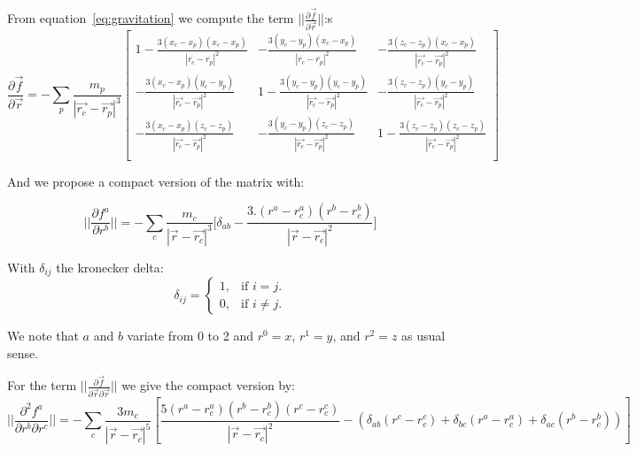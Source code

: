  From equation~\ref{eq:gravitation} we compute the term $||\frac{\partial\vec{f}}{\partial\vec{r}}||$:s
 \begin{equation}
\frac{\partial\vec{f}}{\partial\vec{r}} =
- \sum_p \frac{m_p}{|\vec{r_c}-\vec{r_p}|^3}
\begin{bmatrix}
1 - \frac{3(x_c-x_p)(x_c-x_p)}{|\overline{r_c}-\overline{r_p}|^2} & -\frac{3(y_c-y_p)(x_c-x_p)}{|\overline{r_c}-\overline{r_p}|^2}  & -\frac{3(z_c-z_p)(x_c-x_p)}{|\vec{r_c}-\vec{r_p}|^2}  \\
-\frac{3(x_c-x_p)(y_c-y_p)}{|\vec{r_c}-\vec{r_p}|^2}  & 1 - \frac{3(y_c-y_p)(y_c-y_p)}{|\vec{r_c}-\vec{r_p}|^2} &  -\frac{3(z_c-z_p)(y_c-y_p)}{|\vec{r_c}-\vec{r_p}|^2}\\
- \frac{3(x_c-x_p)(z_c-z_p)}{|\vec{r_c}-\vec{r_p}|^2}   &  -\frac{3(y_c-y_p)(z_c-z_p)}{|\vec{r_c}-\vec{r_p}|^2} &  1- \frac{3(z_c-z_p)(z_c-z_p)}{|\vec{r_c}-\vec{r_p}|^2} \\
\end{bmatrix}
 \end{equation}

And we propose a compact version of the matrix with: 
 
\begin{equation}
 ||\frac{\partial f^a}{\partial r^b}|| = -\sum_c \frac{m_c}{|\vec{r}-\vec{r_c}|^3} \Big[ \delta_{ab} - \frac{3.(r^a-r_c^a)(r^b-r_c^b)}{|\vec{r}-\vec{r_c}|^2} \Big] 
\end{equation}

With $\delta_{ij}$ the kronecker delta:
\begin{equation}
\delta_{ij} = 
\begin{cases}
    1, & \text{if $i = j$}.\\
    0, & \text{if $i\neq j$}.
  \end{cases}
\end{equation}

We note that $a$ and $b$ variate from 0 to 2 and $r^0=x$, $r^1=y$, and $r^2=z$ as usual sense. 

For the term $||\frac{\partial\vec{f}}{\partial\vec{r} \partial\vec{r}}||$ we give the compact version by:
\begin{equation}
||\frac{\partial^2 f^a}{\partial r^b \partial r^c}|| =
- \sum_c \frac{3 m_c}{|\vec{r}-\vec{r_c}|^5} \left[\frac{5(r^a-r_c^a)(r^b-r_c^b)(r^c-r_c^c)}{|\vec{r}-\vec{r_c}|^2} - \left( \delta_{ab} (r^c-r_c^c)+\delta_{bc} (r^a-r_c^a)+\delta_{ac} (r^b-r_c^b) \right) \right] 
 \end{equation} 

